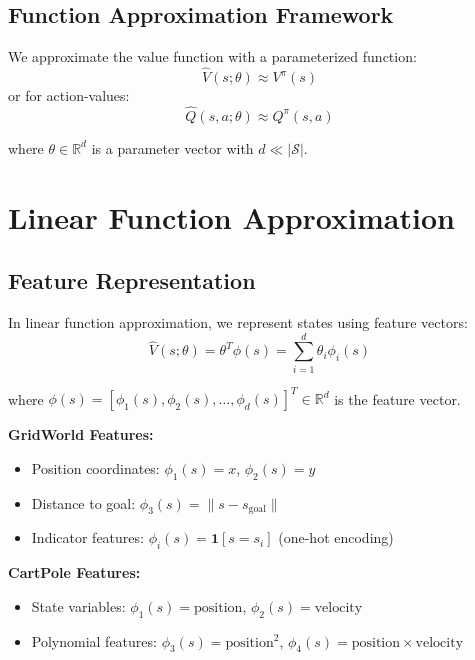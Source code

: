 \subsection{Function Approximation Framework}

We approximate the value function with a parameterized function:
\begin{equation}
\hat{V}(s; \theta) \approx V^\pi(s)
\end{equation}
or for action-values:
\begin{equation}
\hat{Q}(s,a; \theta) \approx Q^\pi(s,a)
\end{equation}

where $\theta \in \mathbb{R}^d$ is a parameter vector with $d \ll |\mathcal{S}|$.

\section{Linear Function Approximation}

\subsection{Feature Representation}

In linear function approximation, we represent states using feature vectors:
\begin{equation}
\hat{V}(s; \theta) = \theta^T \phi(s) = \sum_{i=1}^d \theta_i \phi_i(s)
\end{equation}

where $\phi(s) = [\phi_1(s), \phi_2(s), \ldots, \phi_d(s)]^T \in \mathbb{R}^d$ is the feature vector.

\begin{examplebox}
\textbf{GridWorld Features:}
\begin{itemize}
\item Position coordinates: $\phi_1(s) = x$, $\phi_2(s) = y$
\item Distance to goal: $\phi_3(s) = \|s - s_{\text{goal}}\|$
\item Indicator features: $\phi_i(s) = \mathbf{1}[s = s_i]$ (one-hot encoding)
\end{itemize}

\textbf{CartPole Features:}
\begin{itemize}
\item State variables: $\phi_1(s) = \text{position}$, $\phi_2(s) = \text{velocity}$
\item Polynomial features: $\phi_3(s) = \text{position}^2$, $\phi_4(s) = \text{position} \times \text{velocity}$
\end{itemize}
\end{examplebox}


